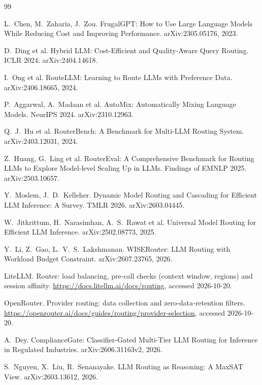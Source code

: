 \documentclass[11pt]{article}
\begin{document}
\begin{thebibliography}{99}
\small

 L.~Chen, M.~Zaharia, J.~Zou. FrugalGPT: How to Use Large Language Models
While Reducing Cost and Improving Performance. arXiv:2305.05176, 2023.

 D.~Ding et al. Hybrid LLM: Cost-Efficient and Quality-Aware Query Routing.
ICLR 2024. arXiv:2404.14618.

 I.~Ong et al. RouteLLM: Learning to Route LLMs with Preference Data.
arXiv:2406.18665, 2024.

 P.~Aggarwal, A.~Madaan et al. AutoMix: Automatically Mixing Language Models.
NeurIPS 2024. arXiv:2310.12963.

 Q.~J.~Hu et al. RouterBench: A Benchmark for Multi-LLM Routing System.
arXiv:2403.12031, 2024.

 Z.~Huang, G.~Ling et al. RouterEval: A Comprehensive Benchmark for Routing
LLMs to Explore Model-level Scaling Up in LLMs. Findings of EMNLP 2025. arXiv:2503.10657.

 Y.~Moslem, J.~D.~Kelleher. Dynamic Model Routing and Cascading for
Efficient LLM Inference: A Survey. TMLR 2026. arXiv:2603.04445.

 W.~Jitkrittum, H.~Narasimhan, A.~S.~Rawat et al. Universal Model Routing for
Efficient LLM Inference. arXiv:2502.08773, 2025.

 Y.~Li, Z.~Gao, L.~V.~S.~Lakshmanan. WISERouter: LLM Routing with Workload
Budget Constraint. arXiv:2607.23765, 2026.

 LiteLLM. Router: load balancing, pre-call checks (context window, regions) and
session affinity. \url{https://docs.litellm.ai/docs/routing}, accessed 2026-10-20.

 OpenRouter. Provider routing: data collection and zero-data-retention
filters. \url{https://openrouter.ai/docs/guides/routing/provider-selection}, accessed 2026-10-20.

 A.~Dey. ComplianceGate: Classifier-Gated Multi-Tier LLM Routing for
Inference in Regulated Industries. arXiv:2606.31163v2, 2026.

 S.~Nguyen, X.~Liu, R.~Senanayake. LLM Routing as Reasoning: A MaxSAT View.
arXiv:2603.13612, 2026.


\end{thebibliography}
\end{document}
